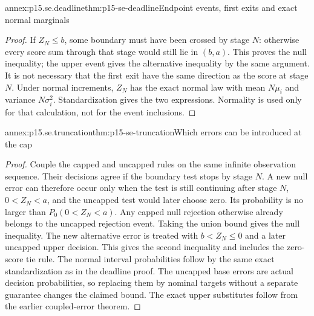 \begin{annexitem}{annex:p15.se.deadline}{thm:p15-se-deadline}{Endpoint events, first exits and exact normal marginals}
\begin{proof}
If \(Z_N\leq b\), some boundary must have been crossed by stage
\(N\): otherwise every score sum through that stage would still lie
in \((b,a)\). This proves the null inequality; the upper event gives
the alternative inequality by the same argument. It is not necessary
that the first exit have the same direction as the score at stage
\(N\). Under normal increments, \(Z_N\) has the exact normal law
with mean \(N\mu_i\) and variance \(N\sigma_i^2\). Standardization
gives the two expressions. Normality is used only for that calculation,
not for the event inclusions.
\end{proof}
\end{annexitem}

\begin{annexitem}{annex:p15.se.truncation}{thm:p15-se-truncation}{Which errors can be introduced at the cap}
\begin{proof}
Couple the capped and uncapped rules on the same infinite observation
sequence. Their decisions agree if the boundary test stops by stage
\(N\). A new null error can therefore occur only when the test is
still continuing after stage \(N\), \(0<Z_N<a\), and the uncapped
test would later choose zero. Its probability is no larger than
\(P_0(0<Z_N<a)\). Any capped null rejection otherwise already belongs
to the uncapped rejection event. Taking the union bound gives the null
inequality. The new alternative error is treated with
\(b<Z_N\leq0\) and a later uncapped upper decision. This gives the
second inequality and includes the zero-score tie rule.
The normal interval probabilities follow by the same exact standardization
as in the deadline proof. The uncapped base errors are actual decision
probabilities, so replacing them by nominal targets without a separate
guarantee changes the claimed bound. The exact upper substitutes follow
from the earlier coupled-error theorem.
\end{proof}
\end{annexitem}

